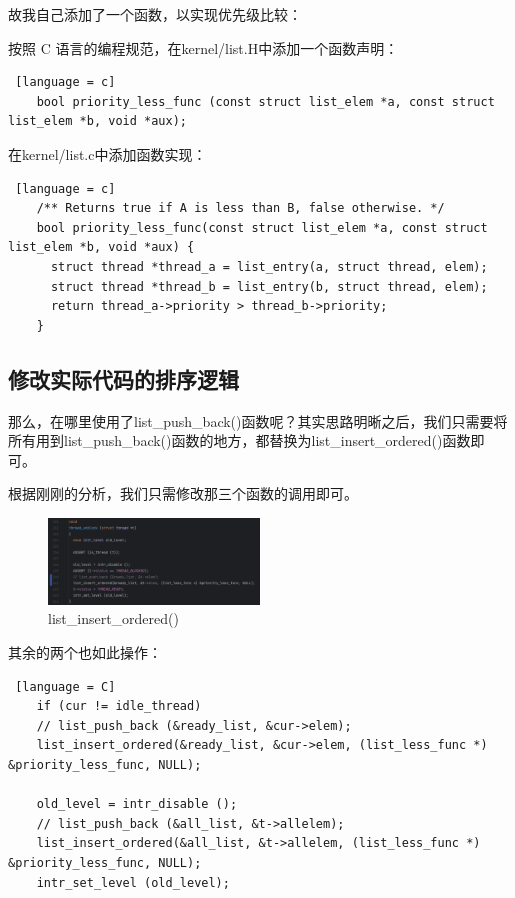 故我自己添加了一个函数，以实现优先级比较：

按照 C 语言的编程规范，在kernel/list.H中添加一个函数声明：
\begin{lstlisting} [language = c]
    bool priority_less_func (const struct list_elem *a, const struct list_elem *b, void *aux);
\end{lstlisting}

在kernel/list.c中添加函数实现：
\begin{lstlisting} [language = c]
    /** Returns true if A is less than B, false otherwise. */
    bool priority_less_func(const struct list_elem *a, const struct list_elem *b, void *aux) {
      struct thread *thread_a = list_entry(a, struct thread, elem);
      struct thread *thread_b = list_entry(b, struct thread, elem);
      return thread_a->priority > thread_b->priority;
    }
\end{lstlisting}

\subsection{修改实际代码的排序逻辑}

那么，在哪里使用了list\_push\_back()函数呢？其实思路明晰之后，我们只需要将所有用到list\_push\_back()函数的地方，都替换为list\_insert\_ordered()函数即可。

根据刚刚的分析，我们只需修改那三个函数的调用即可。

\begin{figure} [H]
    \centering
    \includegraphics[width=0.5\textwidth]{img3/chage.png}
    \caption{list\_insert\_ordered()}
    \label{fig:list_insert_ordered}
\end{figure}

其余的两个也如此操作：

\begin{lstlisting} [language = C]
    if (cur != idle_thread) 
    // list_push_back (&ready_list, &cur->elem);
    list_insert_ordered(&ready_list, &cur->elem, (list_less_func *) &priority_less_func, NULL);

    old_level = intr_disable ();
    // list_push_back (&all_list, &t->allelem);
    list_insert_ordered(&all_list, &t->allelem, (list_less_func *) &priority_less_func, NULL);
    intr_set_level (old_level);
\end{lstlisting}

